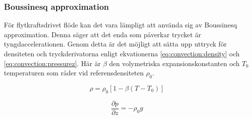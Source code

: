 \subsubsection{Boussinesq approximation}

För flytkraftsdrivet flöde kan det vara lämpligt att använda sig av
Boussinesq approximation. Denna säger att det enda som påverkar trycket är
tyngdaccelerationen. Genom detta är det möjligt att sätta upp uttryck för densiteten
och tryckderivatorna enligt ekvationerna \eqref{eq:convection:density}
och \eqref{eq:convection:pressurez}. Här är
$\beta$ den volymetriska expansionskonstanten och
$T_0$ temperaturen som råder vid referensdensiteten $\rho_0$.

\begin{equation}
\label{eq:convection:density}
\rho = \rho_0[1-\beta(T-T_0)]
\end{equation}

\begin{equation}
\label{eq:convection:pressurez}
\frac{\partial p}{\partial z} = -\rho_0g
\end{equation}


